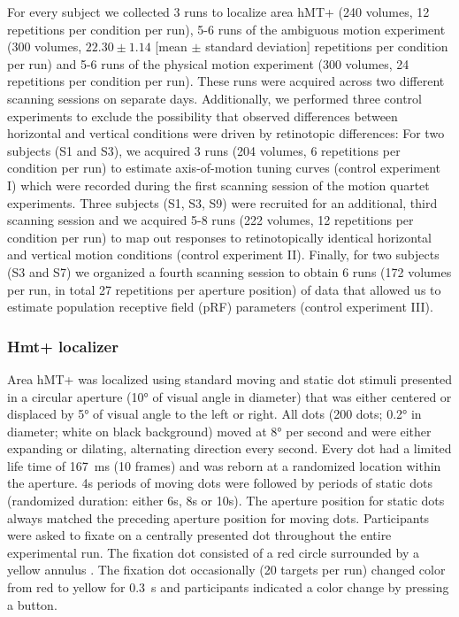 For every subject we collected 3 runs to localize area hMT+ (240 volumes, 12 repetitions per condition per run), 5-6 runs of the ambiguous motion experiment (300 volumes, $ 22.30 \pm 1.14$ [mean $\pm$ standard deviation] repetitions per condition per run) and 5-6 runs of the physical motion experiment (300 volumes, 24 repetitions per condition per run). These runs were acquired across two different scanning sessions on separate days. Additionally, we performed three control experiments to exclude the possibility that observed differences between horizontal and vertical conditions were driven by retinotopic differences: For two subjects (S1 and S3), we acquired 3 runs (204 volumes, 6 repetitions per condition per run) to estimate axis-of-motion tuning curves (control experiment I) which were recorded during the first scanning session of the motion quartet experiments. Three subjects (S1, S3, S9) were recruited for an additional, third scanning session and we acquired 5-8 runs (222 volumes, 12 repetitions per condition per run) to map out responses to retinotopically identical horizontal and vertical motion conditions (control experiment II). Finally, for two subjects (S3 and S7) we organized a fourth scanning session to obtain 6 runs (172 volumes per run, in total 27 repetitions per aperture position) of data that allowed us to estimate population receptive field (pRF) parameters (control experiment III).

\subsubsection{Hmt+ localizer}
Area hMT+ was localized using standard moving and static dot stimuli \parencite{Huk2002, Amano2009, Emmerling2016} presented in a circular aperture (10° of visual angle in diameter) that was either centered or displaced by 5° of visual angle to the left or right. All dots (200 dots; 0.2° in diameter; white on black background) moved at 8° per second and were either expanding or dilating, alternating direction every second. Every dot had a limited life time of 167~ms (10 frames) and was reborn at a randomized location within the aperture. 4s periods of moving dots were followed by periods of static dots (randomized duration: either 6s, 8s or 10s). The aperture position for static dots always matched the preceding aperture position for moving dots. Participants were asked to fixate on a centrally presented dot throughout the entire experimental run. The fixation dot consisted of a red circle surrounded by a yellow annulus \parencite{Marquardt2018}. The fixation dot occasionally (20 targets per run) changed color from red to yellow for 0.3~s and participants indicated a color change by pressing a button.

